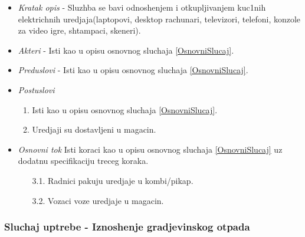 \documentclass[10 pt]{article}
\begin{document}
		\begin{itemize}
			\item\textit{Kratak opis} - Sluzhba se bavi odnoshenjem i otkupljivanjem kuc1nih elektrichnih uredjaja(laptopovi, desktop rachunari, televizori, telefoni, konzole za video igre, shtampaci, skeneri).
			
			\item\textit{Akteri} - Isti kao u opisu osnovnog sluchaja \ref{OsnovniSlucaj}.
			
			\item\textit{Preduslovi} - Isti kao u opisu osnovnog sluchaja \ref{OsnovniSlucaj}.
			
			\item\textit{Postuslovi}
			\begin{enumerate}
				\item Isti kao u opisu osnovnog sluchaja \ref{OsnovniSlucaj}.
				\item Uredjaji su dostavljeni u magacin.
			\end{enumerate}
		
			\item\textit{Osnovni tok}
			Isti koraci kao u opisu osnovnog sluchaja \ref{OsnovniSlucaj}
			uz dodatnu specifikaciju treceg koraka.
			\begin{enumerate}
				\item [3.1.] Radnici pakuju uredjaje u kombi/pikap.
				\item [3.2.] Vozaci voze uredjaje u magacin.
			\end{enumerate}
			
		\end{itemize}
	
	\subsubsection{Sluchaj uptrebe - Iznoshenje gradjevinskog otpada}
		
\end{document}
